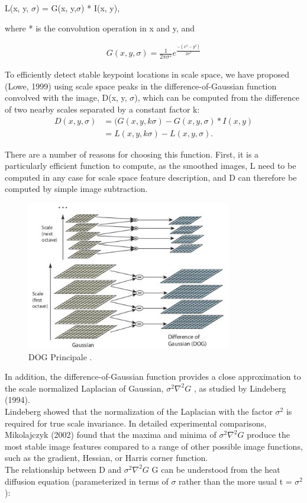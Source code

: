 L(x, y, $\sigma$) = G(x, y,$\sigma$) * I(x, y),


where * is the convolution operation in x and y, and

\begin{align*} 
 G(x, y,\sigma )  =\frac{1}{2\pi\sigma^2} e^\frac{-( x^2 -  y^2)}{2\sigma^2}  
\end{align*}

To efficiently detect stable keypoint locations in scale space, we have proposed (Lowe,
1999) using scale space peaks in the difference-of-Gaussian function convolved with the
image, D(x, y, $\sigma$), which can be computed from the difference of two nearby scales separated
by a constant factor k:
\begin{align}
D(x, y, \sigma) &= (G(x, y, k\sigma) - G(x, y,\sigma) * I(x, y)\\
                 &= L(x, y, k\sigma) - L(x, y, \sigma) .
   \end{align}               
                  
There are a number of reasons for choosing this function. First, it is a particularly
efficient function to compute, as the smoothed images, L  need to be computed in any
case for scale space feature description, and D can therefore be computed by simple image
subtraction.

\begin{figure}[H]
\centering
\includegraphics[width=0.8\textwidth]{img/sift_dog.jpg}
\caption{ DOG Principale .}
\label{fig:sift1}
\end{figure}

In addition, the difference-of-Gaussian function provides a close approximation to the
scale normalized Laplacian of Gaussian, $\sigma^2\nabla^2 G $
, as studied by Lindeberg (1994).\\Lindeberg
showed that the normalization of the Laplacian with the factor $\sigma^2$
is required for true scale invariance. In detailed experimental comparisons, Mikolajczyk (2002) found that the maxima and minima of $\sigma^2\nabla^2 G $  produce the most stable image features compared to a range
of other possible image functions, such as the gradient, Hessian, or Harris corner function.\\
The relationship between D and $\sigma^2\nabla^2G $
G can be understood from the heat diffusion
equation (parameterized in terms of $\sigma$ rather than the more usual t = $\sigma^2$):\\

